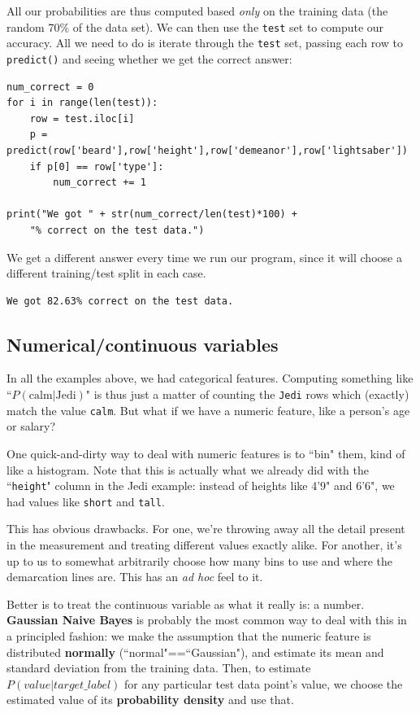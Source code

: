 \documentclass[12pt]{article}
\begin{document}
All our probabilities are thus computed based \textit{only} on the training
data (the random 70\% of the data set). We can then use the \texttt{test} set
to compute our accuracy. All we need to do is iterate through the
\texttt{test} set, passing each row to \texttt{predict()} and seeing whether
we get the correct answer:

\begin{Verbatim}[fontsize=\small,samepage=true,frame=none]
num_correct = 0
for i in range(len(test)):
    row = test.iloc[i]
    p = predict(row['beard'],row['height'],row['demeanor'],row['lightsaber'])
    if p[0] == row['type']:
        num_correct += 1

print("We got " + str(num_correct/len(test)*100) +  
    "% correct on the test data.")
\end{Verbatim}

We get a different answer every time we run our program, since it will choose
a different training/test split in each case.

\begin{Verbatim}[fontsize=\small,samepage=true,frame=none]
We got 82.63% correct on the test data.
\end{Verbatim}

\subsection{Numerical/continuous variables}

In all the examples above, we had categorical features. Computing something
like ``$P(\textrm{calm}|\textrm{Jedi})$" is thus just a matter of counting the
\texttt{Jedi} rows which (exactly) match the value \texttt{calm}. But what if
we have a numeric feature, like a person's age or salary?

One quick-and-dirty way to deal with numeric features is to ``bin" them, kind
of like a histogram. Note that this is actually what we already did with the
``\texttt{height}" column in the Jedi example: instead of heights like 4'9"
and 6'6", we had values like \texttt{short} and \texttt{tall}.

This has obvious drawbacks. For one, we're throwing away all the detail
present in the measurement and treating different values exactly alike. For
another, it's up to us to somewhat arbitrarily choose how many bins to use and
where the demarcation lines are. This has an \textit{ad hoc} feel to it.

Better is to treat the continuous variable as what it really is: a number.
\textbf{Gaussian Naive Bayes} is probably the most common way to deal with
this in a principled fashion: we make the assumption that the numeric feature
is distributed \textbf{normally} (``normal"==``Gaussian"), and estimate its
mean and standard deviation from the training data. Then, to estimate
$P(value|target\_label)$ for any particular test data point's value, we choose
the estimated value of its \textbf{probability density} and use that.
\end{document}
